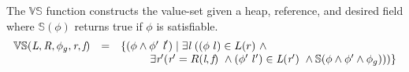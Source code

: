 \begin{definition}
\label{def:VS}
The $\mathbb{VS}$ function constructs the value-set given a
heap, reference, and desired field where $\mathbb{S}(\phi)$ returns true if $\phi$ is satisfiable.
\[
\begin{array}{rcl}
  \mathbb{VS}(\emph{L},\emph{R},\phi_g,\emph{r},\emph{f}) & = &
  \{(\phi\wedge\phi^\prime\ \emph{l}^\prime) \mid \exists
  \emph{l}\ ((\phi\ l) \in L(r)\ \wedge \\ & &
  \ \ \ \ \ \ \ \ \exists \emph{r}^\prime ( \emph{r}^\prime =
  R(\emph{l},\emph{f})\ \wedge (\phi^\prime\ l^\prime) \in
  \emph{L}(\emph{r}^\prime)\ \wedge
  \mathbb{S}(\phi\wedge\phi^\prime\wedge \phi_g)))\}
\end{array}
\]
\end{definition}
